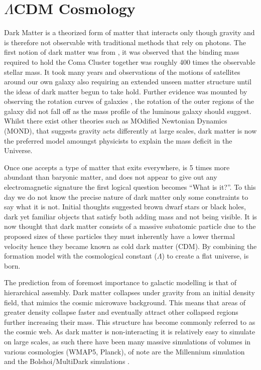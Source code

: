 \section{$\Lambda$CDM Cosmology}
\label{sec:LCDM}
Dark Matter is a theorized form of matter that interacts only though gravity and is therefore not observable with traditional methods that rely on photons. The first notion of dark matter was from \citet{Zwicky1933DieNebeln}, it was observed that the binding mass required to hold the Coma Cluster together was roughly 400 times the observable stellar mass. It took many years and observations of the motions of satellites around our own galaxy also requiring an extended unseen matter structure until the ideas of dark matter begun to take hold. Further evidence was mounted by observing the rotation curves of galaxies \citep{Roberts1973ComparisonTypes}, the rotation of the outer regions of the galaxy did not fall off as the mass profile of the luminous galaxy should suggest. Whilst there exist other theories such as MOdified Newtonian Dynamics (MOND), that suggests gravity acts differently at large scales, dark matter is now the preferred model amoungst physicists to explain the mass deficit in the Universe. 

Once one accepts a type of matter that exits everywhere, is 5 times more abundant than baryonic matter, and does not appear to give out any electromagnetic signature the first logical question becomes ``What is it?''. To this day we do not know the precise nature of dark matter only some constraints to say what it is not. Initial thoughts suggested brown dwarf stars or black holes, dark yet familiar objects that satisfy both adding mass and not being visible. It is now thought that dark matter consists of a massive subatomic particle due to the proposed sizes of these particles they must inherently have a lower thermal velocity hence they became known as cold dark matter (CDM). By combining the formation model with the cosmological constant ($\Lambda$) to create a flat universe, \LCDM is born. 

The prediction from \LCDM of foremost importance to galactic modelling is that of hierarchical assembly. Dark matter collapses under gravity from an initial density field, that mimics the cosmic microwave background. This means that areas of greater density collapse faster and eventually attract other collapsed regions further increasing their mass. This structure has become commonly referred to as the cosmic web. As dark matter is non-interacting it is relatively easy to simulate on large scales, as such there have been many massive simulations of \LCDM volumes in various cosmologies (WMAP5, Planck), of note are the Millennium simulation \citep{Boylan-Kolchin2009ResolvingSimulation} and the Bolshoi/MultiDark simulations \citep{Klypin2016}. 

